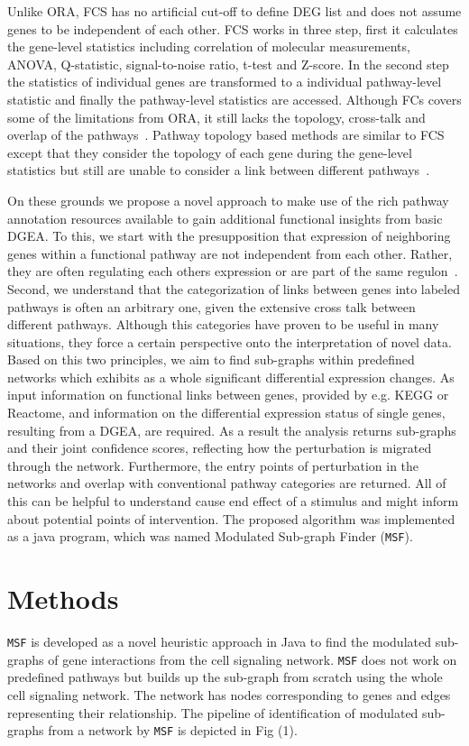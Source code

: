 \documentclass[twocolumn]{article}
\begin{document}
Unlike ORA, FCS has no artificial cut-off to define DEG list and does
not assume genes to be independent of each other. FCS works in three
step, first it calculates the gene-level statistics including correlation of molecular measurements, ANOVA, Q-statistic, signal-to-noise ratio, t-test and Z-score. In the second step the statistics of individual genes are transformed to a individual pathway-level statistic and finally the
pathway-level statistics are accessed. Although FCs covers some of the
limitations from ORA, it still lacks the topology, cross-talk and
overlap of the pathways~\cite{Khatri2012,Campos}. Pathway topology
based methods are similar to FCS except that they consider the
topology of each gene during the gene-level
statistics but still are unable to consider a link between different pathways~\cite{Khatri2012}.

On these grounds we propose a novel approach to make use of the rich
pathway annotation resources available to gain additional functional
insights from basic DGEA. To this, we
start with the presupposition that expression of neighboring genes
within a functional pathway are not independent from each
other. Rather, they are often regulating each others expression or are
part of the same regulon~\cite{Michalak}. Second, we
understand that the categorization of links between genes into labeled
pathways is often an arbitrary one, given the extensive cross talk
between different pathways. Although this categories have proven to be
useful in many situations, they force a certain perspective onto the
interpretation of novel data. Based on this two principles, we aim to
find sub-graphs within predefined networks which exhibits as a whole
significant differential expression changes. As input information on
functional links between genes, provided by e.g. KEGG or Reactome, and
information on the differential expression status of single genes,
resulting from a DGEA, are required. As a result the analysis returns
sub-graphs and their joint confidence scores, reflecting how the
perturbation is migrated through the network. Furthermore, the entry
points of perturbation in the networks and overlap with conventional
pathway categories are returned. All of this can be helpful to
understand cause end effect of a stimulus and might inform about
potential points of intervention. The proposed algorithm was
implemented as a java program, which was named Modulated Sub-graph
Finder (\texttt{MSF}).

\section*{Methods}
\texttt{MSF} is developed as a novel heuristic approach in Java to
find the modulated sub-graphs of gene interactions from the cell
signaling network. \texttt{MSF} does not work on predefined pathways but builds up the sub-graph from scratch using the whole cell signaling network. The network has nodes corresponding to genes and
edges representing their relationship. The pipeline of identification
of modulated sub-graphs from a network by \texttt{MSF} is depicted in
Fig (1).
\end{document}
